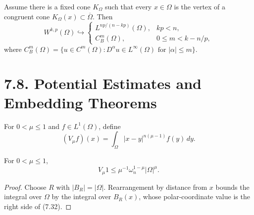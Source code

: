 \begin{proposition}
\label{gt:prop-sobolev-cone-embedding}
Assume there is a fixed cone $K_\Omega$ such that every $x\in\Omega$ is the
vertex of a congruent cone $K_\Omega(x)\subset\overline\Omega$. Then
\[
W^{k,p}(\Omega)\hookrightarrow
\begin{cases}
L^{np/(n-kp)}(\Omega),&kp<n,\\
C_B^m(\Omega),&0\leq m<k-n/p,
\end{cases}
\]
where
$C_B^m(\Omega)=\{u\in C^m(\Omega):D^\alpha u\in L^\infty(\Omega)
\text{ for }|\alpha|\leq m\}$.
\end{proposition}

\section*{7.8. Potential Estimates and Embedding Theorems}
\label{gt:sec-potential-estimates}

\begin{definition}
\label{gt:def-sobolev-riesz-potential}
For $0<\mu\leq1$ and $f\in L^1(\Omega)$, define
\begin{equation}
\tag{7.31}
(V_\mu f)(x)=\int_\Omega |x-y|^{n(\mu-1)}f(y)\,dy.
\end{equation}
\end{definition}

\begin{proposition}
\label{gt:prop-sobolev-riesz-potential-one}
For $0<\mu\leq1$,
\begin{equation}
\tag{7.32}
V_\mu1\leq \mu^{-1}\omega_n^{1-\mu}|\Omega|^\mu.
\end{equation}
\end{proposition}
\begin{proof}
\sketch Choose $R$ with $|B_R|=|\Omega|$. Rearrangement by distance from
$x$ bounds the integral over $\Omega$ by the integral over $B_R(x)$, whose
polar-coordinate value is the right side of (7.32).
\end{proof}

